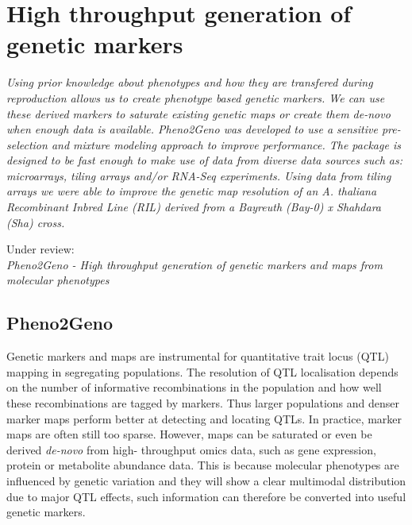 \chapter{High throughput generation of genetic markers}
\thispagestyle{empty}
\label{chap:pheno2geno}
\emph{Using prior knowledge about phenotypes and how they are transfered during 
reproduction allows us to create phenotype based genetic markers. We can use 
these derived markers to saturate existing genetic maps or create them de-novo 
when enough data is available. Pheno2Geno was developed to use a sensitive 
pre-selection and mixture modeling approach to improve performance. The package 
is designed to be fast enough to make use of data from diverse data sources such 
as: microarrays, tiling arrays and/or RNA-Seq experiments. Using data from tiling 
arrays we were able to improve the genetic map resolution of an A. thaliana 
Recombinant Inbred Line (RIL) derived from a Bayreuth (Bay-0) x Shahdara (Sha) cross.}

\null
\vfill

\begin{myexampleblock}{Under review:}
  \\
  \emph{Pheno2Geno - High throughput generation of genetic markers and maps from molecular phenotypes}\\
\end{myexampleblock}
\newpage

\section{Pheno2Geno}
Genetic markers and maps are instrumental for quantitative trait locus (QTL) mapping in segregating 
populations. The resolution of QTL localisation depends on the number of informative recombinations 
in the population and how well these recombinations are tagged by markers. Thus larger populations 
and denser marker maps perform better at detecting and locating QTLs. In practice, marker maps are 
often still too sparse. However, maps can be saturated or even be derived \emph{de-novo} from high-
throughput omics data, such as gene expression, protein or metabolite abundance data. This is because 
molecular phenotypes are influenced by genetic variation and they will show a clear multimodal 
distribution due to major QTL effects, such information can therefore be converted into useful 
genetic markers.

